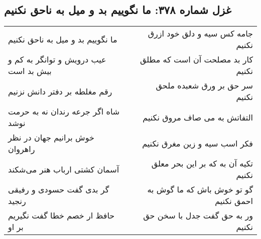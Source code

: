 \begin{center}
\section*{غزل شماره ۳۷۸: ما نگوییم بد و میل به ناحق نکنیم}
\label{sec:sh378}
\begin{longtable}{l p{0.5cm} r}
ما نگوییم بد و میل به ناحق نکنیم
&&
جامه کس سیه و دلق خود ازرق نکنیم
\\
عیب درویش و توانگر به کم و بیش بد است
&&
کار بد مصلحت آن است که مطلق نکنیم
\\
رقم مغلطه بر دفتر دانش نزنیم
&&
سر حق بر ورق شعبده ملحق نکنیم
\\
شاه اگر جرعه رندان نه به حرمت نوشد
&&
التفاتش به می صاف مروق نکنیم
\\
خوش برانیم جهان در نظر راهروان
&&
فکر اسب سیه و زین مغرق نکنیم
\\
آسمان کشتی ارباب هنر می‌شکند
&&
تکیه آن به که بر این بحر معلق نکنیم
\\
گر بدی گفت حسودی و رفیقی رنجید
&&
گو تو خوش باش که ما گوش به احمق نکنیم
\\
حافظ ار خصم خطا گفت نگیریم بر او
&&
ور به حق گفت جدل با سخن حق نکنیم
\\
\end{longtable}
\end{center}
